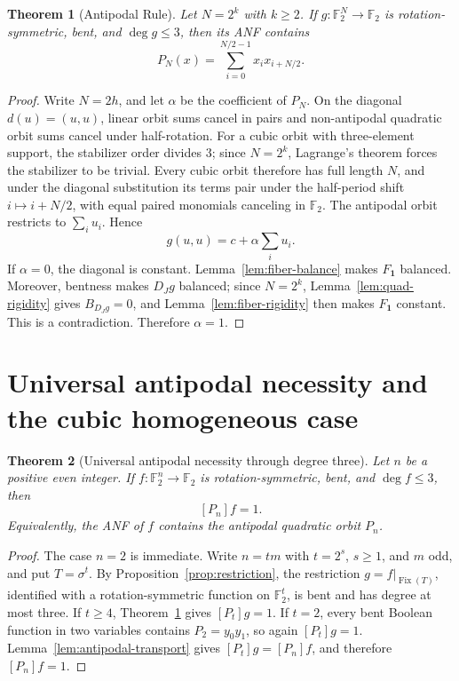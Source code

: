 \documentclass[11pt,a4paper]{article}
\newtheorem{theorem}{Theorem}[section]
\theoremstyle{remark}
\theoremstyle{plain}
\newcommand{\F}{\mathbb F_2}
\newcommand{\Fix}{\operatorname{Fix}}
\begin{document}
\begin{theorem}[Antipodal Rule]\label{thm:antipodal}
Let \(N=2^k\) with \(k\ge2\). If \(g:\F^N\to\F\) is rotation-symmetric, bent, and \(\deg g\le3\), then its ANF contains
\[
P_N(x)=\sum_{i=0}^{N/2-1}x_i x_{i+N/2}.
\]
\end{theorem}
\begin{proof}
Write \(N=2h\), and let \(\alpha\) be the coefficient of \(P_N\). On the diagonal \(d(u)=(u,u)\), linear orbit sums cancel in pairs and non-antipodal quadratic orbit sums cancel under half-rotation. For a cubic orbit with three-element support, the stabilizer order divides $3$; since $N=2^k$, Lagrange's theorem forces the stabilizer to be trivial. Every cubic orbit therefore has full length $N$, and under the diagonal substitution its terms pair under the half-period shift $i\mapsto i+N/2$, with equal paired monomials canceling in $\F$. The antipodal orbit restricts to \(\sum_i u_i\). Hence
\[
g(u,u)=c+\alpha\sum_i u_i.
\]
If \(\alpha=0\), the diagonal is constant. Lemma~\ref{lem:fiber-balance} makes \(F_{\mathbf1}\) balanced. Moreover, bentness makes \(D_Jg\) balanced; since \(N=2^k\), Lemma~\ref{lem:quad-rigidity} gives \(B_{D_Jg}=0\), and Lemma~\ref{lem:fiber-rigidity} then makes \(F_{\mathbf1}\) constant. This is a contradiction. Therefore \(\alpha=1\).
\end{proof}

\section{Universal antipodal necessity and the cubic homogeneous case}

\begin{theorem}[Universal antipodal necessity through degree three]\label{thm:universal-antipodal}
Let $n$ be a positive even integer. If $f:\F^n\to\F$ is rotation-symmetric, bent, and $\deg f\le3$, then
\[
[P_n]f=1.
\]
Equivalently, the ANF of $f$ contains the antipodal quadratic orbit $P_n$.
\end{theorem}
\begin{proof}
The case $n=2$ is immediate. Write $n=tm$ with $t=2^s$, $s\ge1$, and $m$ odd, and put $T=\sigma^t$. By Proposition~\ref{prop:restriction}, the restriction $g=f|_{\Fix(T)}$, identified with a rotation-symmetric function on $\F^t$, is bent and has degree at most three. If $t\ge4$, Theorem~\ref{thm:antipodal} gives $[P_t]g=1$. If $t=2$, every bent Boolean function in two variables contains $P_2=y_0y_1$, so again $[P_t]g=1$. Lemma~\ref{lem:antipodal-transport} gives $[P_t]g=[P_n]f$, and therefore $[P_n]f=1$.
\end{proof}
\end{document}
